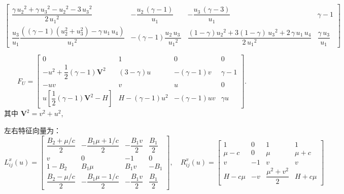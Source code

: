 \documentclass{book}
\begin{document}
\begin{example}
\begin{example}{}{}
\begin{example}
\begin{example}
\begin{example}
\begin{example}
\begin{example}{}{}
\begin{equation}
\begin{bmatrix}
        \dfrac{\gamma \,{u_2 }^2 +\gamma \,{u_3 }^2 -{u_2 }^2 -3\,{u_3 }^2 }{2\,{u_1 }^2 }            & -\dfrac{u_2 \,{\left(\gamma -1\right)}}{u_1 }            & -\dfrac{u_3 \,{\left(\gamma -3\right)}}{u_1 }                                           & \gamma -1                   \\
        \dfrac{u_3}{u_1}\dfrac{{\left((\gamma-1)(u_2^2+u_3^2)-\gamma \,u_1 \,u_4 \right)}}{{u_1 }^2 } & -{\left(\gamma -1\right)}\dfrac{u_2 \,u_3 \,}{{u_1 }^2 } & \dfrac{(1-\gamma){u_2 }^2 +3(1-\gamma)\,{u_3 }^2 +2\,\gamma \,u_1 \,u_4 }{2\,{u_1 }^2 } & \dfrac{\gamma \,u_3 }{u_1 }
    \end{bmatrix}
\end{equation}

\begin{equation}
    F_U=\begin{bmatrix}
        0                                                     & 1                  & 0               & 0        \\
        -u^{2}+\dfrac{1}{2}(\gamma-1) \mathbf{V}^{2}          & (3-\gamma) u       & -(\gamma-1) v   & \gamma-1 \\
        -u v                                                  & v                  & u               & 0        \\
        u\left[\dfrac{1}{2}(\gamma-1) \mathbf{V}^{2}-H\right] & H-(\gamma-1) u^{2} & -(\gamma-1) u v & \gamma u
    \end{bmatrix} .
\end{equation}
其中 $\mathbf{V}^2=v^2+u^2$,

左右特征向量为\cite{RN95}：
\begin{equation}
    L_{i j}^{x}(u)=\begin{bmatrix}
        \dfrac{B_{2}+\mu / c}{2} & -\dfrac{B_{1} \mu+1 / c}{2} & -\dfrac{B_{1} v}{2} & \dfrac{B_{1}}{2} \\
        v                        & 0                           & -1                  & 0                \\
        1-B_{2}                  & B_{1} \mu                   & B_{1} v             & -B_{1}           \\
        \dfrac{B_{2}-\mu / c}{2} & -\dfrac{B_{1} \mu-1 / c}{2} & -\dfrac{B_{1} v}{2} & \dfrac{B_{1}}{2}
    \end{bmatrix},\quad
    R_{i j}^{x}(u)=\begin{bmatrix}
        1       & 0  & 1                        & 1       \\
        \mu-c   & 0  & \mu                      & \mu+c   \\
        v       & -1 & v                        & v       \\
        H-c \mu & -v & \dfrac{\mu^{2}+v^{2}}{2} & H+c \mu
    \end{bmatrix}
\end{equation}


\end{example}
\end{example}
\end{example}
\end{example}
\end{example}
\end{example}
\end{example}
\end{document}
